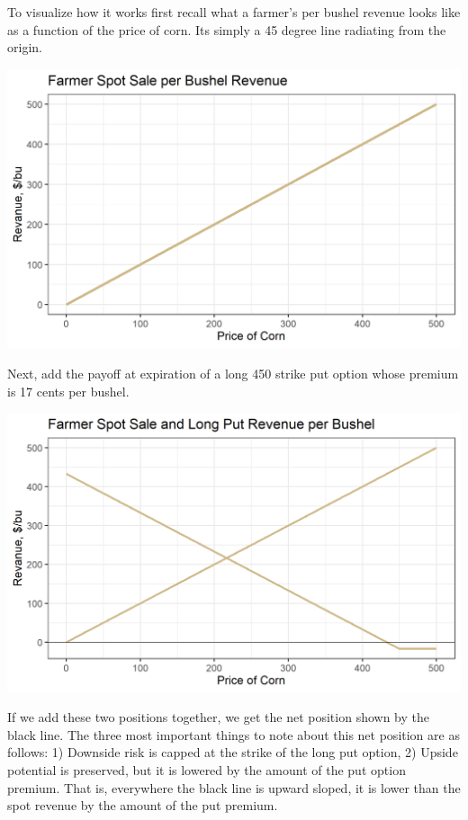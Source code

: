 \documentclass[
  letterpaper,
  DIV=11,
  numbers=noendperiod]{scrreprt}
\begin{document}
To visualize how it works first recall what a farmer's per bushel
revenue looks like as a function of the price of corn. Its simply a 45
degree line radiating from the origin.

\includegraphics{assets/Options4-spot.png}

Next, add the payoff at expiration of a long 450 strike put option whose
premium is 17 cents per bushel.

\includegraphics{assets/Options4-spotput.png}

If we add these two positions together, we get the net position shown by
the black line. The three most important things to note about this net
position are as follows: 1) Downside risk is capped at the strike of the
long put option, 2) Upside potential is preserved, but it is lowered by
the amount of the put option premium. That is, everywhere the black line
is upward sloped, it is lower than the spot revenue by the amount of the
put premium.
\end{document}
